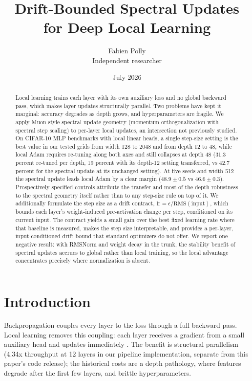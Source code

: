 \documentclass[11pt]{article}
\title{Drift-Bounded Spectral Updates for Deep Local Learning}
\author{Fabien Polly\\ \small Independent researcher}
\date{July 2026}
\newcommand{\eps}{\epsilon}
\begin{document}
\maketitle

\begin{abstract}
Local learning trains each layer with its own auxiliary loss and no global backward pass, which makes layer updates structurally parallel. Two problems have kept it marginal: accuracy degrades as depth grows, and hyperparameters are fragile. We apply Muon-style spectral update geometry (momentum orthogonalization with spectral step scaling) to per-layer local updates, an intersection not previously studied. On CIFAR-10 MLP benchmarks with local linear heads, a single step-size setting is the best value in our tested grids from width 128 to 2048 and from depth 12 to 48, while local Adam requires re-tuning along both axes and still collapses at depth 48 (31.3 percent re-tuned per depth, 19 percent with its depth-12 setting transferred, vs 42.7 percent for the spectral update at its unchanged setting). At five seeds and width 512 the spectral update leads local Adam by a clear margin ($48.9 \pm 0.5$ vs $46.6 \pm 0.3$). Prospectively specified controls attribute the transfer and most of the depth robustness to the spectral geometry itself rather than to any step-size rule on top of it. We additionally formulate the step size as a drift contract, $\mathrm{lr} = \eps / \mathrm{RMS}(\text{input})$, which bounds each layer's weight-induced pre-activation change per step, conditioned on its current input. The contract yields a small gain over the best fixed learning rate where that baseline is measured, makes the step size interpretable, and provides a per-layer, input-conditioned drift bound that standard optimizers do not offer. We report one negative result: with RMSNorm and weight decay in the trunk, the stability benefit of spectral updates accrues to global rather than local training, so the local advantage concentrates precisely where normalization is absent.
\end{abstract}

\section{Introduction}

Backpropagation couples every layer to the loss through a full backward pass. Local learning removes this coupling: each layer receives a gradient from a small auxiliary head and updates immediately \citep{nokland2019local,belilovsky2019decoupled,hinton2022forward}. The benefit is structural parallelism (4.34x throughput at 12 layers in our pipeline implementation, separate from this paper's code release); the historical costs are a depth pathology, where features degrade after the first few layers, and brittle hyperparameters.
\end{document}
